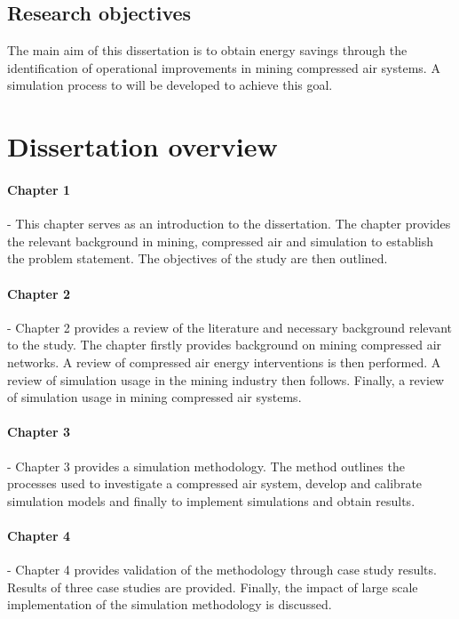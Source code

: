  			\subsection{Research objectives}
		The main aim of this dissertation is to obtain energy savings through the identification of operational improvements in mining compressed air systems. A simulation process to will be developed to achieve this goal.
\section{Dissertation overview}
	\paragraph{Chapter 1} \hspace{0.4cm} - \hspace{0.05cm} This chapter serves as an introduction to the dissertation. The chapter provides the relevant background in mining, compressed air and simulation to establish the problem statement. The objectives of the study are then outlined.
	\paragraph{Chapter 2} \hspace{0.4cm} - \hspace{0.05cm} Chapter 2 provides a review of the literature and necessary background relevant to the study. The chapter firstly provides background on mining compressed air networks. A review of compressed air energy interventions is then performed. A review of simulation usage in the mining industry then follows. Finally, a review of simulation usage in mining compressed air systems.
	\paragraph{Chapter 3} \hspace{0.4cm} - \hspace{0.05cm} Chapter 3 provides a simulation methodology. The method outlines the processes used to investigate a compressed air system, develop and calibrate simulation models and finally to implement simulations and obtain results.
	\paragraph{Chapter 4} \hspace{0.4cm} - \hspace{0.05cm} Chapter 4 provides validation of the methodology through case study results. Results of three case studies are provided. Finally, the impact of large scale implementation of the simulation methodology is discussed.
